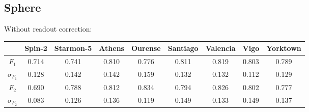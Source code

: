 \subsection{Sphere}
Without readout correction:
\begin{table}[H]
    \centering
    \begin{tabular}{|c|c|c|c|c|c|c|c|c|}
    \hline
    \textbf{} & \textbf{Spin-2} & \textbf{Starmon-5} & \textbf{Athens} & \textbf{Ourense} & \textbf{Santiago} & \textbf{Valencia} & \textbf{Vigo} & \textbf{Yorktown} \\ \hline
    $F_1$              & 0.714  & 0.741 & 0.810 & 0.776 & 0.811 & 0.819 & 0.803 & 0.789 \\ \hline
    $\sigma_{F_1}$     & 0.128  & 0.142 & 0.142 & 0.159 & 0.132 & 0.132 & 0.112 & 0.129 \\ \hline
    $F_2$              & 0.690  & 0.788 & 0.812 & 0.834 & 0.794 & 0.826 & 0.802 & 0.777 \\ \hline
    $\sigma_{F_2}$     & 0.083  & 0.126 & 0.136 & 0.119 & 0.149 & 0.133 & 0.149 & 0.137 \\ \hline
    \end{tabular}
\end{table}

